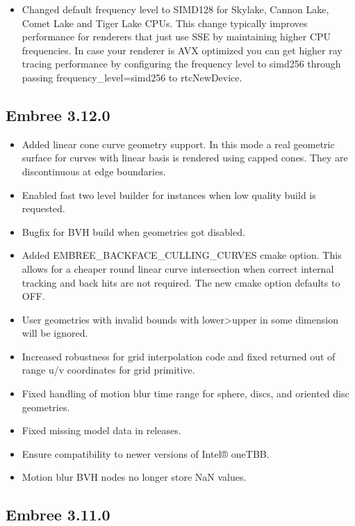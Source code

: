 \begin{itemize}
\tightlist
\item
  Changed default frequency level to SIMD128 for Skylake, Cannon Lake,
  Comet Lake and Tiger Lake CPUs. This change typically improves
  performance for renderers that just use SSE by maintaining higher CPU
  frequencies. In case your renderer is AVX optimized you can get higher
  ray tracing performance by configuring the frequency level to simd256
  through passing frequency\_level=simd256 to rtcNewDevice.
\end{itemize}

\subsection{Embree 3.12.0}\label{embree-3.12.0}

\begin{itemize}
\tightlist
\item
  Added linear cone curve geometry support. In this mode a real
  geometric surface for curves with linear basis is rendered using
  capped cones. They are discontinuous at edge boundaries.
\item
  Enabled fast two level builder for instances when low quality build is
  requested.
\item
  Bugfix for BVH build when geometries got disabled.
\item
  Added EMBREE\_BACKFACE\_CULLING\_CURVES cmake option. This allows for
  a cheaper round linear curve intersection when correct internal
  tracking and back hits are not required. The new cmake option defaults
  to OFF.
\item
  User geometries with invalid bounds with lower\textgreater upper in
  some dimension will be ignored.
\item
  Increased robustness for grid interpolation code and fixed returned
  out of range u/v coordinates for grid primitive.
\item
  Fixed handling of motion blur time range for sphere, discs, and
  oriented disc geometries.
\item
  Fixed missing model data in releases.
\item
  Ensure compatibility to newer versions of Intel® oneTBB.
\item
  Motion blur BVH nodes no longer store NaN values.
\end{itemize}

\subsection{Embree 3.11.0}\label{embree-3.11.0}

